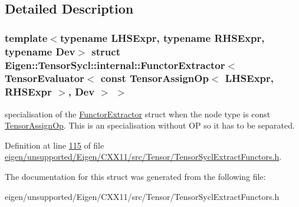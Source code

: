 \subsection{Detailed Description}
\subsubsection*{template$<$typename L\+H\+S\+Expr, typename R\+H\+S\+Expr, typename Dev$>$\newline
struct Eigen\+::\+Tensor\+Sycl\+::internal\+::\+Functor\+Extractor$<$ Tensor\+Evaluator$<$ const Tensor\+Assign\+Op$<$ L\+H\+S\+Expr, R\+H\+S\+Expr $>$, Dev $>$ $>$}

specialisation of the \hyperlink{struct_eigen_1_1_tensor_sycl_1_1internal_1_1_functor_extractor}{Functor\+Extractor} struct when the node type is const \hyperlink{class_eigen_1_1_tensor_assign_op}{Tensor\+Assign\+Op}. This is an specialisation without OP so it has to be separated. 

Definition at line \hyperlink{eigen_2unsupported_2_eigen_2_c_x_x11_2src_2_tensor_2_tensor_sycl_extract_functors_8h_source_l00115}{115} of file \hyperlink{eigen_2unsupported_2_eigen_2_c_x_x11_2src_2_tensor_2_tensor_sycl_extract_functors_8h_source}{eigen/unsupported/\+Eigen/\+C\+X\+X11/src/\+Tensor/\+Tensor\+Sycl\+Extract\+Functors.\+h}.



The documentation for this struct was generated from the following file\+:\begin{DoxyCompactItemize}
\item 
eigen/unsupported/\+Eigen/\+C\+X\+X11/src/\+Tensor/\+Tensor\+Sycl\+Extract\+Functors.\+h\end{DoxyCompactItemize}
